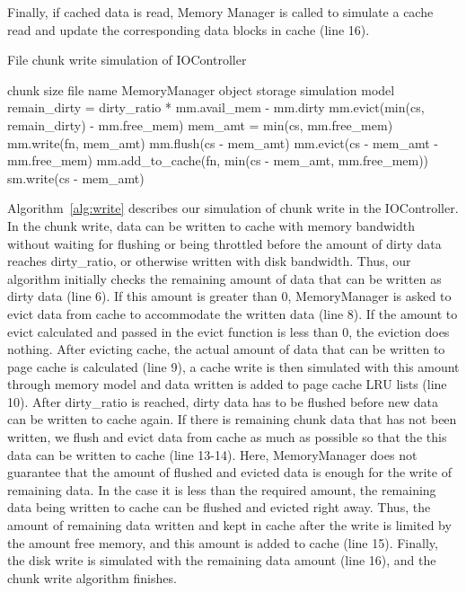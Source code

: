 \documentclass[conference]{IEEEtran}
\newcommand{\Desc}[2]{\State \makebox[2em][l]{#1}#2}
\begin{document}
    Finally, if cached data is read, Memory Manager is called to simulate a cache read  
    and update the corresponding data blocks in cache (line 16).
    \begin{algorithm}\caption{File chunk write simulation of IOController}
    \label{alg:write}
        \small
        \begin{algorithmic}[1]
            \Input
                \Desc{cs}{chunk size}
                \Desc{fn}{file name}
                \Desc{mm}{MemoryManager object}
                \Desc{sm}{storage simulation model}
               \EndInput
            \State remain\_dirty = dirty\_ratio * mm.avail\_mem - mm.dirty
             
                \State mm.evict(min(cs, remain\_dirty) - mm.free\_mem)
                \State mem\_amt = min(cs, mm.free\_mem)
                \State mm.write(fn, mem\_amt) 
            \EndIf
              
                \State mm.flush(cs - mem\_amt)  
                \State mm.evict(cs - mem\_amt  - mm.free\_mem) 
                \State mm.add\_to\_cache(fn, min(cs - mem\_amt, mm.free\_mem))
                \State sm.write(cs - mem\_amt)
            \EndIf
            
        \end{algorithmic}
    \end{algorithm}
    Algorithm~\ref{alg:write} describes our simulation of chunk write in 
    the IOController. 
    In the chunk write, data can be written to cache with memory bandwidth 
    without waiting for flushing or being throttled before the amount of 
    dirty data reaches dirty\_ratio, or otherwise written with disk bandwidth.
    Thus, our algorithm initially checks the remaining amount of data that 
    can be written as dirty data (line 6).
    If this amount is greater than 0, MemoryManager is asked to evict 
    data from cache to accommodate the written data (line 8). 
    If the amount to evict calculated and passed in the evict function is less than 0, 
    the eviction does nothing.
    After evicting cache, the actual amount of data that can be written to 
    page cache is calculated (line 9), a cache write is then simulated 
    with this amount through memory model and data written is added to 
    page cache LRU lists (line 10).
    After dirty\_ratio is reached, dirty data has to be flushed before new data 
    can be written to cache again. 
    If there is remaining chunk data that has not been written, we flush and 
    evict data from cache as much as possible so that the this data can be 
    written to cache (line 13-14). 
    Here, MemoryManager does not guarantee that the amount of flushed 
    and evicted data is enough for the write of remaining data. 
    In the case it is less than the required amount, the remaining data 
    being written to cache can be flushed and evicted right away. 
    Thus, the amount of remaining data written and kept in cache 
    after the write is limited by the amount free memory, and this amount 
    is added to cache (line 15). 
    Finally, the disk write is simulated with the remaining data amount (line 16), 
    and the chunk write algorithm finishes.
            
\end{document}
